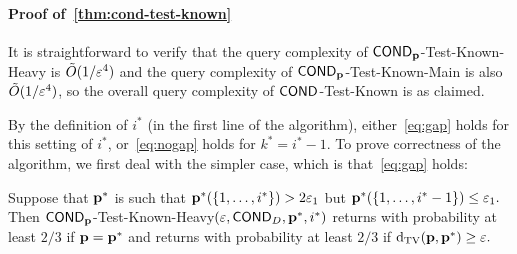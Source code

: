 \paragraph{Proof of~\cref{thm:cond-test-known}}

It is straightforward to verify that
the query complexity of ${\sf COND}_{\mathbf{p}}$-Test-Known-Heavy is
$\tilde{O}(1/\varepsilon^4)$ and the query complexity of ${\sf COND}_{\mathbf{p}}$-Test-Known-Main
is also $\tilde{O}(1/\varepsilon^4)$, so the overall query complexity of
{\sc ${\sf COND}$-Test-Known} is as claimed.

By the definition of $i^\ast$ (in the first line of the algorithm), either~\cref{eq:gap} holds for this setting of $i^\ast$, or~\cref{eq:nogap} holds for $k^\ast = i^\ast -1$. To prove correctness of the algorithm, we first deal with the simpler case, which is
that~\cref{eq:gap} holds:


\begin{lemma} \label{lem:test-heavy}
Suppose that $\mathbf{p}^\ast$ is such that $\mathbf{p}^\ast(\{1,\dots,i^\ast\}) >
2 {\varepsilon_1}$ but $\D^\ast(\{1,\dots,i^\ast-1\}) \leq {\eps_1}.$
Then {\sc ${\sf COND}_{\mathbf{p}}$-Test-Known-Heavy$(\varepsilon,{\sf COND}_D,\mathbf{p}^\ast,i^\ast)$}
returns \accept with probability at least $2/3$ if $\mathbf{p} = \mathbf{p}^\ast$
and returns \reject with probability at least $2/3$ if \mbox{$\operatorname{d}_{\textrm{TV}}(\mathbf{p},\mathbf{p}^\ast)\geq \varepsilon.$}
\end{lemma}

